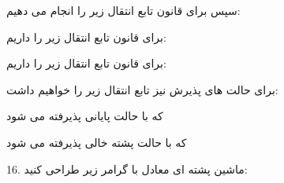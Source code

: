 \documentclass[]{article}
\begin{document}
\begin{center}
\end{center}

سپس برای قانون  تابع انتقال زیر را انجام می دهیم:

\begin{center}
\end{center}

برای قانون  تابع انتقال زیر را داریم:

\begin{center}
\end{center}

برای قانون  تابع انتقال زیر را داریم:

\begin{center}
\end{center}

برای حالت های پذیرش نیز تابع انتقال زیر را خواهیم داشت:

\begin{center}
\end{center}
که با حالت پایانی پذیرفته می شود
\begin{center}
\end{center}
که با حالت پشته خالی پذیرفته می شود



16. ماشین پشته ای معادل با گرامر زیر طراحی کنید:

\begin{center}
\end{center}
\begin{center}
\end{center}
\begin{center}
\end{center}
\begin{center}
\end{center}
\begin{center}
\end{center}
\end{document}
